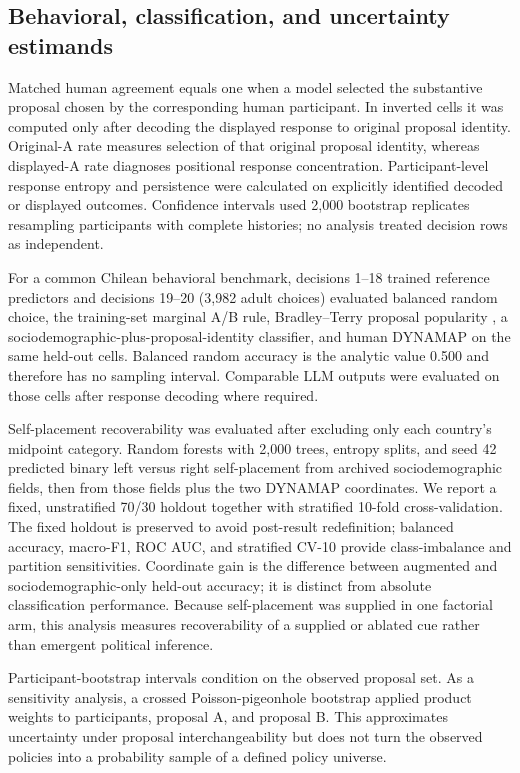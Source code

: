 \documentclass[unnumsec,webpdf,modern,large]{oup-authoring-template}
\begin{document}
\subsection{Behavioral, classification, and uncertainty estimands}

Matched human agreement equals one when a model selected the substantive proposal chosen by the corresponding human participant. In inverted cells it was computed only after decoding the displayed response to original proposal identity. Original-A rate measures selection of that original proposal identity, whereas displayed-A rate diagnoses positional response concentration. Participant-level response entropy and persistence were calculated on explicitly identified decoded or displayed outcomes. Confidence intervals used 2,000 bootstrap replicates resampling participants with complete histories; no analysis treated decision rows as independent.

For a common Chilean behavioral benchmark, decisions 1--18 trained reference predictors and decisions 19--20 (3,982 adult choices) evaluated balanced random choice, the training-set marginal A/B rule, Bradley--Terry proposal popularity \citep{Bradley1952}, a sociodemographic-plus-proposal-identity classifier, and human DYNAMAP on the same held-out cells. Balanced random accuracy is the analytic value 0.500 and therefore has no sampling interval. Comparable LLM outputs were evaluated on those cells after response decoding where required.

Self-placement recoverability was evaluated after excluding only each country's midpoint category. Random forests with 2,000 trees, entropy splits, and seed 42 predicted binary left versus right self-placement from archived sociodemographic fields, then from those fields plus the two DYNAMAP coordinates. We report a fixed, unstratified 70/30 holdout together with stratified 10-fold cross-validation. The fixed holdout is preserved to avoid post-result redefinition; balanced accuracy, macro-F1, ROC AUC, and stratified CV-10 provide class-imbalance and partition sensitivities. Coordinate gain is the difference between augmented and sociodemographic-only held-out accuracy; it is distinct from absolute classification performance. Because self-placement was supplied in one factorial arm, this analysis measures recoverability of a supplied or ablated cue rather than emergent political inference.

Participant-bootstrap intervals condition on the observed proposal set. As a sensitivity analysis, a crossed Poisson-pigeonhole bootstrap applied product weights to participants, proposal A, and proposal B. This approximates uncertainty under proposal interchangeability but does not turn the observed policies into a probability sample of a defined policy universe.
\end{document}
